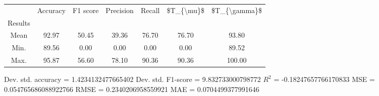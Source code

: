 \begin{tabular}{|c|c|c|c|c|c|c|}
\toprule
{} &  Accuracy &  F1 score &  Precision &  Recall &  \$T\_\{\textbackslash mu\}\$ &  \$T\_\{\textbackslash gamma\}\$ \\
Results &           &           &            &         &            &               \\
\hline
Mean    &     92.97 &     50.45 &      39.36 &   76.70 &      76.70 &         93.80 \\
Min.    &     89.56 &      0.00 &       0.00 &    0.00 &       0.00 &         89.52 \\
Max.    &     95.87 &     56.60 &      78.10 &   90.36 &      90.36 &        100.00 \\
\bottomrule
\end{tabular}

 Dev. std. accuracy = 1.4234132477665402
 Dev. std. F1-score = 9.832733000798772
 $R^2$ = -0.18247657766170833
 MSE = 0.054765686088922766
 RMSE = 0.2340206958559921
 MAE = 0.0704499377991646